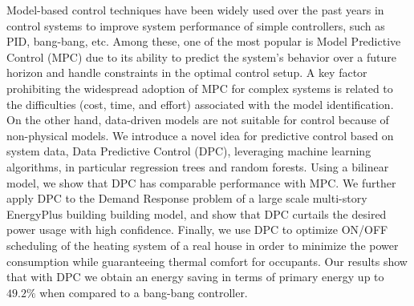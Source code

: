 Model-based control techniques have been widely used over the past years in control systems to improve system performance of simple controllers, such as PID, bang-bang, etc. Among these, one of the most popular is Model Predictive Control (MPC) due to its ability to predict the system's behavior over a future horizon and handle constraints in the optimal control setup. A key factor prohibiting the widespread adoption of MPC for complex systems is related to the difficulties (cost, time, and effort) associated with the model identification. 
On the other hand, data-driven models are not suitable for control because of non-physical models.
We introduce a novel idea for predictive control based on system data, Data Predictive Control (DPC), leveraging machine learning algorithms, in particular regression trees and random forests. Using a bilinear model, we show that DPC has comparable performance with MPC. We further apply DPC to the Demand Response problem of a large scale multi-story EnergyPlus building building model, and show that DPC curtails the desired power usage with high confidence. Finally, we use DPC to optimize ON/OFF scheduling of the heating system of a real house in order to minimize the power consumption while guaranteeing thermal comfort for occupants. Our results show that with DPC we obtain an energy saving in terms of primary energy up to $49.2\%$ when compared to a bang-bang controller.